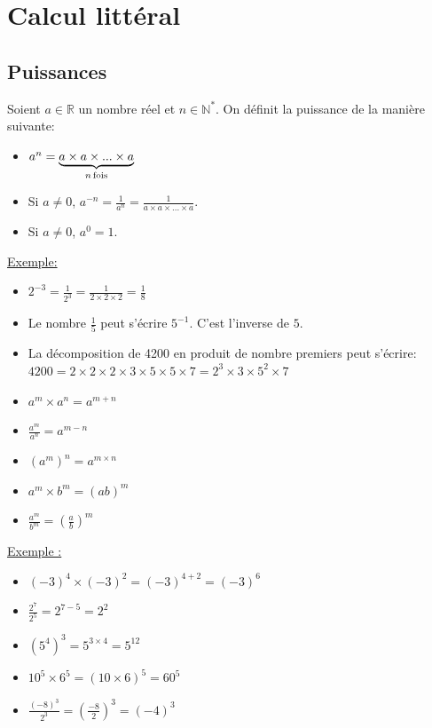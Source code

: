 \documentclass[french]{book}
\begin{document}
\chapter{Calcul littéral}
\section{Puissances}
\begin{defn}
Soient $a\in\mathbb{R}$ un nombre réel et $n\in \mathbb{N}^{*}$. On définit la puissance de la manière suivante:

\begin{itemize}
\item[$\bullet$]$a^n=\underbrace{a\times a \times ... \times a}_{n \, \rm fois}$
\item[$\bullet$] Si $a \neq 0$, $a^{-n}=\frac{1}{a^n}=\frac{1}{a\times a \times ... \times a}$. 
\item[$\bullet$] Si $a\neq 0$, $a^0=1$.
\end{itemize}
\end{defn}

\underline{Exemple:}
\begin{itemize}
\item[$\bullet$]$2^{-3}=\frac{1}{2^3}=\frac{1}{2\times 2 \times 2}=\frac{1}{8}$
\item[$\bullet$] Le nombre $\frac{1}{5}$ peut s'écrire $5^{-1}$. C'est l'inverse de $5$.

\item[$\bullet$] La décomposition de 4200 en produit de nombre premiers peut s'écrire:
$4200=2\times2\times2\times3\times5\times5\times7=2^3\times3\times5^2\times7$
\end{itemize}

\begin{prop}
\begin{itemize}
\item[$\bullet$] $a^m \times a^n = a^{m+n} $
\item[$\bullet$] $\frac{a^m}{a^n}= a^{m-n} $
\item[$\bullet$] $(a^m)^n=a^{m\times n}$
\item[$\bullet$] $a^m \times b^m = (ab)^m $
\item[$\bullet$] $\frac{a^m}{b^m}=(\frac{a}{b})^m$
\end{itemize}
\end{prop}

\underline{Exemple :}
\begin{itemize}
\item[$\bullet$]$(-3)^4 \times (-3)^2= (-3)^{4+2}=(-3)^6$
\item[$\bullet$]$\frac{2^7}{2^5}=2^{7-5}=2^2$
\item[$\bullet$]$(5^4)^3=5^{3 \times 4}=5^{12}$
\item[$\bullet$]$10^5\times 6^5=(10\times 6)^5=60^5$
\item[$\bullet$]$\frac{(-8)^3}{2^3}=(\frac{-8}{2})^3=(-4)^3$
\end{itemize}
\end{document}
